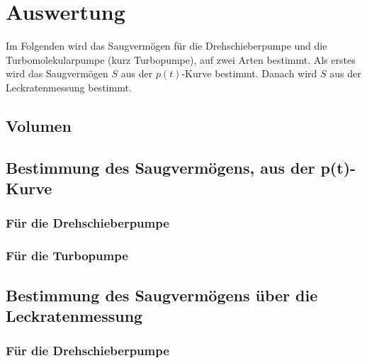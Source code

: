 \section{Auswertung}
\label{sec:Auswertung}
Im Folgenden wird das Saugvermögen für die Drehschieberpumpe und die Turbomolekularpumpe (kurz Turbopumpe), auf zwei Arten bestimmt. Als erstes wird das Saugvermögen $S$ aus der $p(t)$-Kurve bestimmt. Danach wird $S$ aus der Leckratenmessung bestimmt.


\subsection{Volumen}


\subsection{Bestimmung des Saugvermögens, aus der p(t)-Kurve}
\subsubsection{Für die Drehschieberpumpe}
\subsubsection{Für die Turbopumpe}



\subsection{Bestimmung des Saugvermögens über die Leckratenmessung}

\subsubsection{Für die Drehschieberpumpe}

